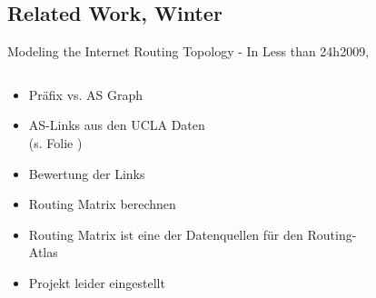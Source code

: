 \documentclass[ngerman,compress,hyperref={bookmarks}]{beamer}
\begin{document}
\subsection{Related Work, Winter}
\begin{frame}{Modeling the Internet Routing Topology - In Less than 24h}{2009, \cite{Winter:2009:MIR:1577959.1577976}}
  \begin{columns}[c]
    \begin{column}{0.5\textwidth}
      \begin{itemize}
        \item Präfix vs. AS Graph
        \item AS-Links aus den UCLA Daten\\{\scriptsize{(s. Folie \pageref{zhang_et_al})}}
        \item Bewertung der Links
        \item Routing Matrix berechnen
      \end{itemize}
      {\small
      \begin{itemize}
        \item Routing Matrix ist eine der Datenquellen für den Routing-Atlas
        \item Projekt leider eingestellt
      \end{itemize}}
    \end{column}
    \begin{column}{0.09\textwidth}
      \begin{figure}
        \label{winter}

\end{figure}
\end{column}
\end{columns}
\end{frame}
\end{document}
